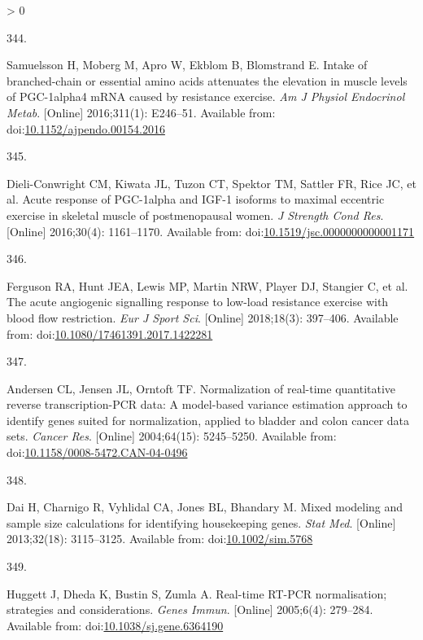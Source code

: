 \documentclass[twoside,10pt]{gihclass} %
\newlength{\cslhangindent}
\newlength{\csllabelwidth}
\newenvironment{CSLReferences}[3] %
 {%
  \setlength{\parindent}{0pt}
  \ifodd #1 \everypar{\setlength{\hangindent}{\cslhangindent}}\ignorespaces\fi
  \ifnum #2 > 0
  \setlength{\parskip}{#2\baselineskip}
  \fi
 }%
 {}
\newcommand{\CSLLeftMargin}[1]{\parbox[t]{\maxof{\widthof{#1}}{\csllabelwidth}}{#1}}
\newcommand{\CSLRightInline}[1]{\parbox[t]{\linewidth}{#1}}
\begin{document}
\begin{CSLReferences}{0}{0}
\leavevmode\hypertarget{ref-RN2084}{}%
\CSLLeftMargin{344. }
\CSLRightInline{Samuelsson H, Moberg M, Apro W, Ekblom B, Blomstrand E. Intake of branched-chain or essential amino acids attenuates the elevation in muscle levels of PGC-1alpha4 mRNA caused by resistance exercise. \emph{Am J Physiol Endocrinol Metab}. {[}Online{]} 2016;311(1): E246--51. Available from: doi:\href{https://doi.org/10.1152/ajpendo.00154.2016}{10.1152/ajpendo.00154.2016}}

\leavevmode\hypertarget{ref-RN2086}{}%
\CSLLeftMargin{345. }
\CSLRightInline{Dieli-Conwright CM, Kiwata JL, Tuzon CT, Spektor TM, Sattler FR, Rice JC, et al. Acute response of PGC-1alpha and IGF-1 isoforms to maximal eccentric exercise in skeletal muscle of postmenopausal women. \emph{J Strength Cond Res}. {[}Online{]} 2016;30(4): 1161--1170. Available from: doi:\href{https://doi.org/10.1519/jsc.0000000000001171}{10.1519/jsc.0000000000001171}}

\leavevmode\hypertarget{ref-RN2087}{}%
\CSLLeftMargin{346. }
\CSLRightInline{Ferguson RA, Hunt JEA, Lewis MP, Martin NRW, Player DJ, Stangier C, et al. The acute angiogenic signalling response to low-load resistance exercise with blood flow restriction. \emph{Eur J Sport Sci}. {[}Online{]} 2018;18(3): 397--406. Available from: doi:\href{https://doi.org/10.1080/17461391.2017.1422281}{10.1080/17461391.2017.1422281}}

\leavevmode\hypertarget{ref-RN1772}{}%
\CSLLeftMargin{347. }
\CSLRightInline{Andersen CL, Jensen JL, Orntoft TF. Normalization of real-time quantitative reverse transcription-PCR data: A model-based variance estimation approach to identify genes suited for normalization, applied to bladder and colon cancer data sets. \emph{Cancer Res}. {[}Online{]} 2004;64(15): 5245--5250. Available from: doi:\href{https://doi.org/10.1158/0008-5472.CAN-04-0496}{10.1158/0008-5472.CAN-04-0496}}

\leavevmode\hypertarget{ref-RN1771}{}%
\CSLLeftMargin{348. }
\CSLRightInline{Dai H, Charnigo R, Vyhlidal CA, Jones BL, Bhandary M. Mixed modeling and sample size calculations for identifying housekeeping genes. \emph{Stat Med}. {[}Online{]} 2013;32(18): 3115--3125. Available from: doi:\href{https://doi.org/10.1002/sim.5768}{10.1002/sim.5768}}

\leavevmode\hypertarget{ref-RN1984}{}%
\CSLLeftMargin{349. }
\CSLRightInline{Huggett J, Dheda K, Bustin S, Zumla A. Real-time RT-PCR normalisation; strategies and considerations. \emph{Genes Immun}. {[}Online{]} 2005;6(4): 279--284. Available from: doi:\href{https://doi.org/10.1038/sj.gene.6364190}{10.1038/sj.gene.6364190}}


\end{CSLReferences}
\end{document}
